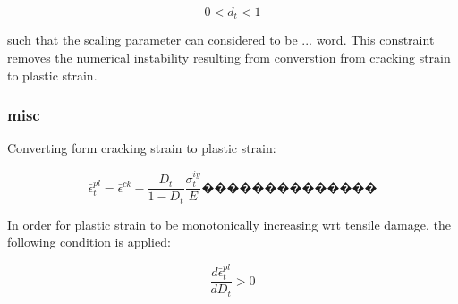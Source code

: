 \begin{equation}
0<d_{t}<1\label{eqn:param10}
\end{equation}


such that the scaling parameter can considered to be ... word. This
constraint removes the numerical instability resulting from converstion
from cracking strain to plastic strain. 


\subsubsection{misc}

Converting form cracking strain to plastic strain:

\begin{equation}
\bar{\epsilon}_{t}^{pl}=\bar{\epsilon}^{ck}-\frac{D_{t}}{1-D_{t}}\frac{\sigma_{t}^{iy}}{E}��������������\label{eqn:param5}
\end{equation}


In order for plastic strain to be monotonically increasing wrt tensile
damage, the following condition is applied:

\begin{equation}
\frac{d\bar{\epsilon}_{t}^{pl}}{dD_{t}}>0\label{eqn:param6}
\end{equation}
